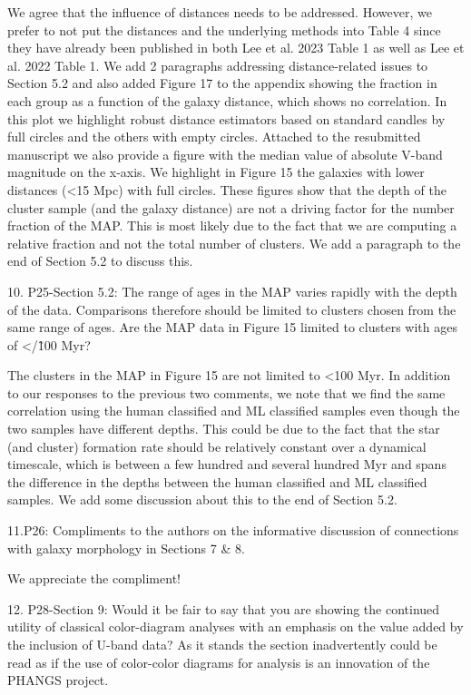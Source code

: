 We agree that the influence of distances needs to be addressed. However, we prefer to not put the distances and the underlying methods into Table 4 since they have already been published in both Lee et al. 2023 Table 1 as well as Lee et al. 2022 Table 1. We add 2 paragraphs addressing distance-related issues to Section 5.2 and also added Figure 17 to the appendix showing the fraction in each group as a function of the galaxy distance, which shows no correlation. In this plot we highlight robust distance estimators based on standard candles by full circles and the others with empty circles.  Attached to the resubmitted manuscript we also provide a figure with the median value of absolute V-band magnitude on the x-axis. We highlight in Figure 15 the galaxies with lower distances (<15 Mpc) with full circles. These figures show that the depth of the cluster sample (and the galaxy distance) are not a driving factor for the number fraction of the MAP. This is most likely due to the fact that we are computing a relative fraction and not the total number of clusters. We add a paragraph to the end of Section 5.2 to discuss this.


10. P25-Section 5.2: The range of ages in the MAP varies rapidly with the depth of the data. Comparisons therefore should be limited to clusters chosen from the same range of ages. Are the MAP data in Figure 15 limited to clusters with ages of </\~100 Myr?

The clusters in the MAP in Figure 15 are not limited to <100 Myr.  In addition to our responses to the previous two comments, we note that we find the same correlation using the human classified and ML classified samples even though the two samples have different depths. This could be due to the fact that the star (and cluster) formation rate should be relatively constant over a dynamical timescale, which is between a few hundred and several hundred Myr and spans the difference in the depths between the human classified and ML classified samples. 
We add some discussion about this to the end of Section 5.2.

11.P26: Compliments to the authors on the informative discussion of connections with galaxy morphology in Sections 7 \& 8.

We appreciate the compliment!

12. P28-Section 9: Would it be fair to say that you are showing the continued utility of classical color-diagram analyses with an emphasis on the value added by the inclusion of U-band data? As it stands the section inadvertently could be read as if the use of color-color diagrams for analysis is an innovation of the PHANGS project.


